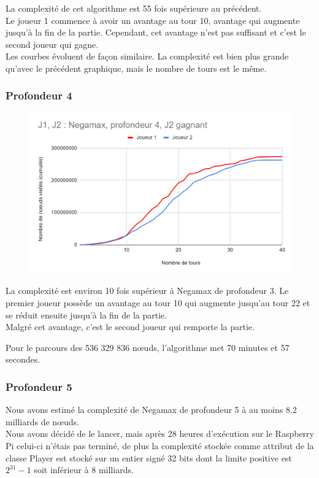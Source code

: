 \documentclass[12pt]{article}
\begin{document}
La complexité de cet algorithme est 55 fois supérieure au précédent.\\
Le joueur 1 commence à avoir un avantage au tour 10, avantage qui augmente jusqu’à la fin de la partie. Cependant, cet avantage n’est pas suffisant et c’est le second joueur qui gagne.\\

Les courbes évoluent de façon similaire.
La complexité est bien plus grande qu'avec le précédent graphique, mais le nombre de tours est le même.

\newpage
\subsubsection{Profondeur 4}

\begin{figure}[!h]
   \includegraphics[width=\textwidth]{prof4negamax.png}
\end{figure}

La complexité est environ 10 fois supérieur à Negamax de profondeur 3. Le premier joueur possède un avantage au tour 10 qui augmente jusqu’au tour 22 et se réduit ensuite jusqu’à la fin de la partie.\\
Malgré cet avantage, c’est le second joueur qui remporte la partie.


Pour le parcours des 536 329 836 nœuds, l’algorithme met 70 minutes et 57 secondes. 
\newpage
\subsubsection{Profondeur 5}

Nous avons estimé la complexité de Negamax de profondeur 5 à au moins 8.2 milliards de nœuds.\\
Nous avons décidé de le lancer, mais après 28 heures d’exécution sur le Raspberry Pi celui-ci n’étais pas terminé, de plus la complexité stockée comme attribut de la classe Player est stocké sur un entier signé 32 bits dont la limite positive est $2^{31} - 1$ soit inférieur à 8 milliards.
\end{document}
